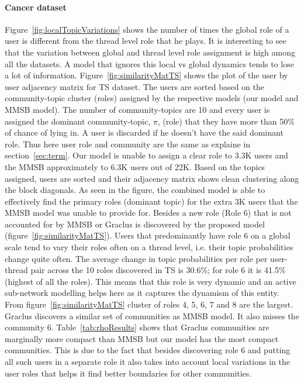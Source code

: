 \documentclass{sig-alternate}
\begin{document}
\paragraph{Cancer dataset}
Figure~\ref{fig:localTopicVariations} shows the number of times the global role
of a user is different from the thread level role that he plays. It is 
interesting to see that the variation between global and thread level role
assignment is high among all the datasets. A model that ignores this local vs
global dynamics tends to lose a lot of information.
Figure~\ref{fig:similarityMatTS} shows the plot of the user by user adjacency 
matrix for TS dataset. The users are sorted based on the community-topic cluster
(roles) assigned by the respective models (our model and MMSB model). The number of
community-topics are 10 and every user is assigned the dominant
community-topic, $\pi$, (role) that they have more than 50\% of chance of lying in. A user 
is discarded if he
doesn't have the said dominant role. Thus here user role and community are the same
as explaine in section~\ref{sec:term}.
Our model is unable to assign a clear 
role to 3.3K users and
the MMSB approximately to 6.3K users out of 22K. Based on the topics assigned,
users are sorted and their adjacency matrix shows clean clustering along the
block diagonals.
As seen in the figure, the combined model is able to effectively find the
primary roles (dominant topic) for the extra 3K users that the MMSB model was
unable to provide for. Besides a new role (Role 6) that is not accounted for by
MMSB or Graclus is discovered by the proposed model (figure~\ref{fig:similarityMatTS}).
Users that predominantly have role 6 on a global scale tend to vary their roles
often on a thread level, i.e. their topic probabilities change quite often. The
average change in topic probabilities per role per user-thread pair across the
10 roles discovered in TS is 30.6\%; for role 6 it is 41.5\% (highest of all the roles). 
This means
that this role is very dynamic and an active sub-network modelling helps here as 
it captures the
dynamism of this entity. From figure~\ref{fig:similarityMatTS} cluster of roles
4, 5, 6, 7 and 8 are the largest. 
Graclus discovers a similar set of communities as MMSB model. It also misses
the community 6. Table~\ref{tab:rhoResults} shows that Graclus communities 
are marginally more compact than MMSB but our model has the most compact 
communities. This is due to the fact that besides discovering role 6 and putting all 
such users in a separate role it also takes into account local variations
in the user roles that helps it find better boundaries for other communities.
\end{document}
